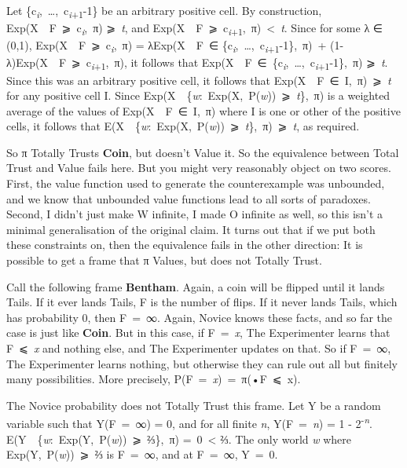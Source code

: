 \documentclass[
  12pt,
  letterpaper,
  DIV=11,
  numbers=noendperiod]{scrartcl}
\begin{document}
Let \{c\textsubscript{\emph{i}},~\ldots,~c\textsubscript{\emph{i}+1}-1\}
be an arbitrary positive cell. By construction,
Exp(X~\textbar~F~⩾~c\textsubscript{\emph{i}},~π) ⩾~\emph{t}, and
Exp(X~\textbar~F~⩾~c\textsubscript{\emph{i}+1},~π)~\textless~\emph{t}.
Since for some λ ∈ (0,1),
Exp(X~\textbar~F~⩾~c\textsubscript{\emph{i}},~π) = λExp(X~\textbar~F~∈
\{c\textsubscript{\emph{i}},~\ldots,~c\textsubscript{\emph{i}+1}-1\},~π)~+
(1-λ)Exp(X~\textbar~F~⩾~c\textsubscript{\emph{i}+1},~π), it follows that
Exp(X~\textbar~F~∈~\{c\textsubscript{\emph{i}},~\ldots,~c\textsubscript{\emph{i}+1}-1\},~π)
⩾~\emph{t}. Since this was an arbitrary positive cell, it follows that
Exp(X~\textbar~F~∈~I,~π)~⩾~\emph{t} for any positive cell I. Since
Exp(X~\textbar~\{\emph{w}:~Exp(X,~P(\emph{w}))~⩾~\emph{t}\},~π) is a
weighted average of the values of Exp(X~\textbar~F~∈~I,~π) where I is
one or other of the positive cells, it follows that
E(X~\textbar~\{\emph{w}:~Exp(X,~P(\emph{w}))~⩾~\emph{t}\},~π)~⩾~\emph{t},
as required.

So π Totally Trusts \textbf{Coin}, but doesn't Value it. So the
equivalence between Total Trust and Value fails here. But you might very
reasonably object on two scores. First, the value function used to
generate the counterexample was unbounded, and we know that unbounded
value functions lead to all sorts of paradoxes. Second, I didn't just
make W infinite, I made O infinite as well, so this isn't a minimal
generalisation of the original claim. It turns out that if we put both
these constraints on, then the equivalence fails in the other direction:
It is possible to get a frame that π Values, but does not Totally Trust.

Call the following frame \textbf{Bentham}. Again, a coin will be flipped
until it lands Tails. If it ever lands Tails, F is the number of flips.
If it never lands Tails, which has probability 0, then F~=~∞. Again,
Novice knows these facts, and so far the case is just like
\textbf{Coin}. But in this case, if F~=~\emph{x}, The Experimenter
learns that F~⩽~\emph{x} and nothing else, and The Experimenter updates
on that. So if F~=~∞, The Experimenter learns nothing, but otherwise
they can rule out all but finitely many possibilities. More precisely,
P(F~=~\emph{x})~=~π(•\textbar F~⩽~x).

The Novice probability does not Totally Trust this frame. Let Y be a
random variable such that Y(F~=~∞) = 0, and for all finite \emph{n},
Y(F~=~\emph{n}) = 1 - 2\textsuperscript{-\emph{n}}.
E(Y~\textbar~\{\emph{w}:~Exp(Y,~P(\emph{w}))~⩾~⅔\},~π) =~0~\textless{}
⅔. The only world \emph{w} where Exp(Y,~P(\emph{w}))~⩾~⅔ is F~=~∞, and
at F~=~∞, Y~=~0.
\end{document}
